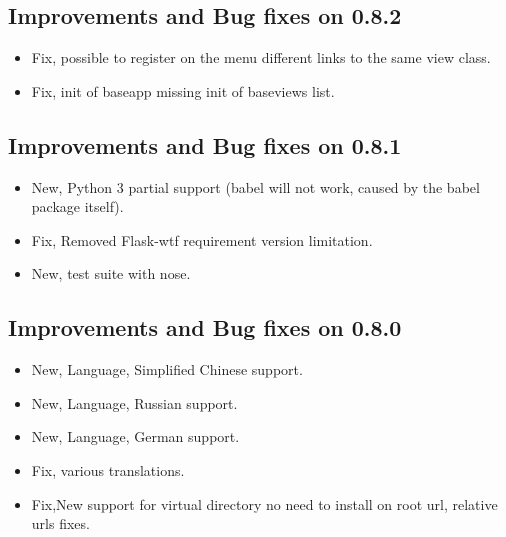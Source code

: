 \documentclass[letterpaper,10pt,english]{sphinxmanual}
\begin{document}
\subsection{Improvements and Bug fixes on 0.8.2}
\label{versions:improvements-and-bug-fixes-on-0-8-2}\begin{itemize}
\item {} 
Fix, possible to register on the menu different links to the same view class.

\item {} 
Fix, init of baseapp missing init of baseviews list.

\end{itemize}


\subsection{Improvements and Bug fixes on 0.8.1}
\label{versions:improvements-and-bug-fixes-on-0-8-1}\begin{itemize}
\item {} 
New, Python 3 partial support (babel will not work, caused by the babel package itself).

\item {} 
Fix, Removed Flask-wtf requirement version limitation.

\item {} 
New, test suite with nose.

\end{itemize}


\subsection{Improvements and Bug fixes on 0.8.0}
\label{versions:improvements-and-bug-fixes-on-0-8-0}\begin{itemize}
\item {} 
New, Language, Simplified Chinese support.

\item {} 
New, Language, Russian support.

\item {} 
New, Language, German support.

\item {} 
Fix, various translations.

\item {} 
Fix,New support for virtual directory no need to install on root url, relative urls fixes.

\end{itemize}
\end{document}
